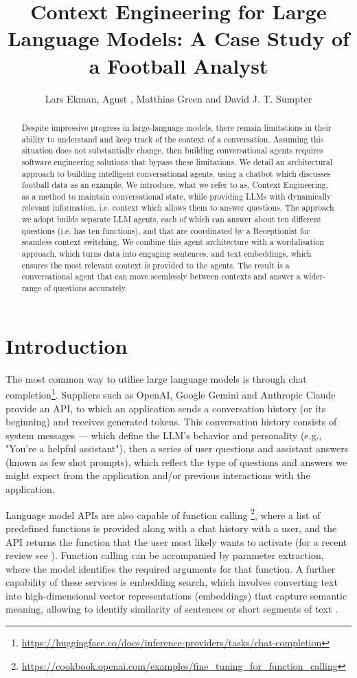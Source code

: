 \documentclass{article}
\title{Context Engineering for Large Language Models: A Case Study of a Football Analyst}
\author{Lars Ekman, Agust , Matthias Green and David J. T. Sumpter}
\date{} %
\begin{document}
\maketitle

\begin{abstract}
Despite impressive progress in large-language models, there remain limitations in their ability to understand and keep track of the context of a conversation. Assuming this situation does not substantially change, then building conversational agents requires software engineering solutions that bypass these limitations. We detail an architectural approach to building intelligent conversational agents, using a chatbot which discusses football data as an example. We introduce, what we refer to as, Context Engineering, as a method to maintain conversational state, while providing LLMs with dynamically relevant information, i.e. context which allows them to answer questions. The approach we adopt builds separate LLM agents, each of which can answer about ten different questions (i.e. has ten functions), and that are coordinated by a Receptionist for seamless context switching. We combine this agent architecture with a wordalisation approach, which turns data into engaging sentences, and text embeddings, which ensures the most relevant context is provided to the agents. The result is a conversational agent that can move seemlessly between contexts and answer a wider-range of questions accurately.
\end{abstract}

\section*{Introduction}

The most common way to utilise large language models is through chat completion\footnote{\url{https://huggingface.co/docs/inference-providers/tasks/chat-completion}}. Suppliers such as OpenAI, Google Gemini and Anthropic Claude provide an API, to which an application sends a conversation history (or its beginning) and receives generated tokens. This conversation history consists of system messages --- which define the LLM's behavior and personality (e.g., "You're a helpful assistant"), then a series of user questions and assistant answers (known as few shot prompts), which reflect the type of questions and answers we might expect from the application and/or previous interactions with the application. 

Language model APIs are also capable of function calling \footnote{\url{https://cookbook.openai.com/examples/fine_tuning_for_function_calling}}, where a list of predefined functions is provided along with a chat history with a user, and the API returns the function that the user most likely wants to activate (for a recent review see \cite{wang2025function}). Function calling can be accompanied by parameter extraction, where the model identifies the required arguments for that function. A further capability of these services is embedding search, which involves converting text into high-dimensional vector representations (embeddings) that capture semantic meaning, allowing to identify similarity of sentences or short segments of text \cite{reimers2019sentence}. 
\end{document}
